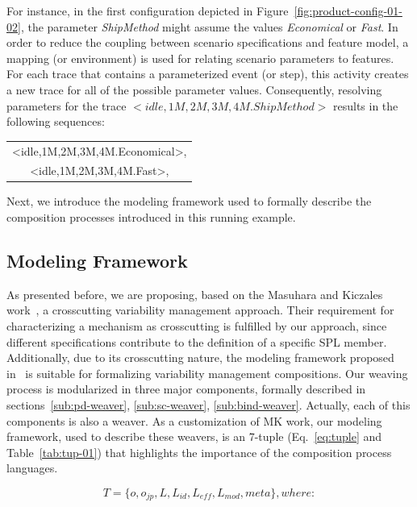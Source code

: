 \documentclass{acm_proc_article-sp}
\begin{document}
For instance, in the first configuration depicted in Figure~\ref{fig:product-config-01-02}, the parameter \emph{ShipMethod} might assume the values \emph{Economical} or \emph{Fast}. In order to reduce the coupling between scenario specifications and feature model, a mapping (or environment) is used for relating scenario parameters to features. For each trace that contains a parameterized event (or step), this activity creates a new trace for all of the possible parameter values. Consequently, resolving parameters for the trace $<idle,1M,2M,3M,4M.ShipMethod>$ results in the following sequences:
 
\begin{center} 
\begin{small}
\begin{tabular}{c}
<idle,1M,2M,3M,4M.Economical>, \\ <idle,1M,2M,3M,4M.Fast>, \\
\end{tabular}
\end{small}
\end{center}

Next, we introduce the modeling framework used to formally describe the composition processes introduced in this running example. 


\subsection{Modeling Framework}

As presented before, we are proposing, based on the Masuhara and Kiczales work~\cite{kiczales-ecoop-2003}, a crosscutting 
variability management approach. Their requirement for characterizing a mechanism as crosscutting is fulfilled by our approach, since different specifications contribute to the definition of a specific SPL member. Additionally, due to its crosscutting nature, the modeling framework proposed in~\cite{kiczales-ecoop-2003}  is suitable for formalizing variability management compositions. 
Our weaving process is modularized in three major components, formally described in sections~\ref{sub:pd-weaver}, \ref{sub:sc-weaver}, \ref{sub:bind-weaver}. Actually, each of this components is also a weaver. As a customization of MK work, our modeling framework, used to describe these weavers, is an 7-tuple (Eq.~\ref{eq:tuple} and Table~\ref{tab:tup-01}) that highlights the importance of the composition process languages. 

\begin{equation}
T = \{o, o_{jp}, L, L_{id}, L_{eff}, L_{mod}, meta\}, where:
\label{eq:tuple}
\end{equation}
\end{document}
